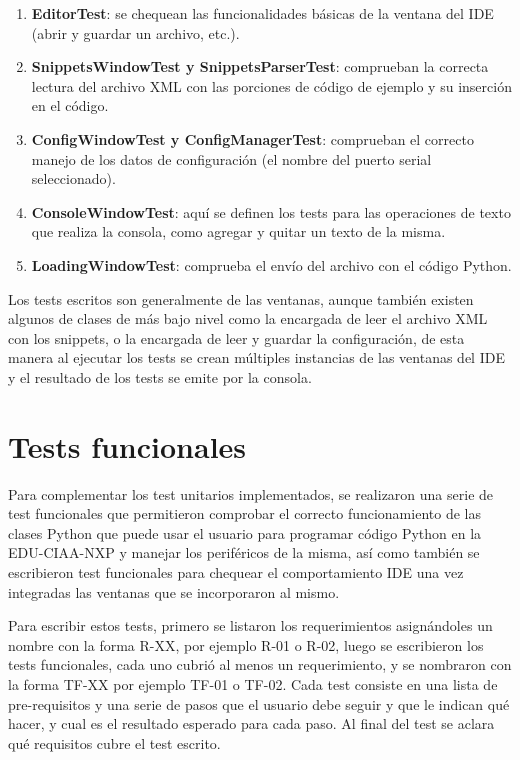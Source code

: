 \begin{enumerate}
	\item  \textbf{EditorTest}: se chequean las funcionalidades básicas de la ventana del IDE (abrir y guardar un archivo, etc.).
	\item  \textbf{SnippetsWindowTest y SnippetsParserTest}: comprueban la correcta lectura del archivo XML con las porciones de código de ejemplo y su inserción en el código.
	\item  \textbf{ConfigWindowTest y ConfigManagerTest}: comprueban el correcto manejo de los datos de configuración (el nombre del puerto serial seleccionado).
	\item  \textbf{ConsoleWindowTest}: aquí se definen los tests para las operaciones de texto que realiza la consola, como agregar y quitar un texto de la misma.
	\item  \textbf{LoadingWindowTest}: comprueba el envío del archivo con el código Python.
\end{enumerate}

Los tests escritos son generalmente de las ventanas, aunque también existen algunos de clases de más bajo nivel como la encargada de leer el archivo XML con los snippets, o la encargada de leer y guardar la configuración, de esta manera al ejecutar los tests se crean múltiples instancias de las ventanas del IDE y el resultado de los tests se emite por la consola.



\section{Tests funcionales}
\label{sec:testFuncionales}

Para complementar los test unitarios implementados, se realizaron una serie de test funcionales que permitieron comprobar el correcto funcionamiento de las clases Python que puede usar el usuario para programar código Python en la EDU-CIAA-NXP y manejar los periféricos de la misma, así como también se escribieron test funcionales para chequear el comportamiento IDE una vez integradas las ventanas que se incorporaron al mismo.

Para escribir estos tests, primero se listaron los requerimientos asignándoles un nombre con la forma R-XX, por ejemplo R-01 o R-02, luego se escribieron los tests funcionales, cada uno cubrió al menos un requerimiento, y se nombraron con la forma TF-XX por ejemplo TF-01 o TF-02. Cada test consiste en una lista de pre-requisitos y una serie de pasos que el usuario debe seguir y que le indican qué hacer, y cual es el resultado esperado para cada paso. Al final del test se aclara qué requisitos cubre el test escrito.

